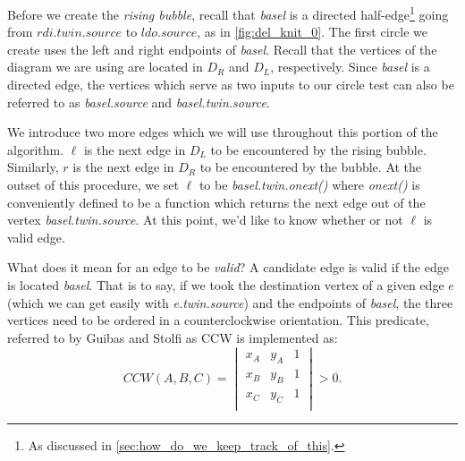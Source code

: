 \documentclass[12pt,twoside]{reedthesis}
\begin{document}


    Before we create the \emph{rising bubble}, recall that \emph{basel} is a directed half-edge\footnote{As discussed in \cref{sec:how_do_we_keep_track_of_this}.} going from $rdi.twin.source$ to $ldo.source$, as in \cref{fig:del_knit_0}. The first circle we create uses the left and right endpoints of \emph{basel}. Recall that the vertices of the diagram we are using are located in $D_{R}$ and $D_{L}$, respectively. Since \emph{basel} is a directed edge, the vertices which serve as two inputs to our circle test can also be referred to as \emph{basel.source} and \emph{basel.twin.source}.\par

    We introduce two more edges which we will use throughout this portion of the algorithm. $\ell$ is the next edge in $D_{L}$ to be encountered by the rising bubble. Similarly, $r$ is the next edge in $D_{R}$ to be encountered by the bubble. At the outset of this procedure, we set $\ell$ to be \emph{basel.twin.onext()} where \emph{onext()} is conveniently defined to be a function which returns the next edge out of the vertex \emph{basel.twin.source}. At this point, we'd like to know whether or not $\ell$ is valid edge. \par 

    What does it mean for an edge to be \emph{valid}? A candidate edge is valid if the edge is located  \emph{basel}. That is to say, if we took the destination vertex of a given edge $e$ (which we can get easily with \emph{e.twin.source}) and the endpoints of \emph{basel}, the three vertices need to be ordered in a counterclockwise orientation. This predicate, referred to by Guibas and Stolfi as \textsc{CCW} is implemented as:
    $$
    CCW(A,B,C) =
    \begin{vmatrix}
    x_{A} & y_{A} & 1 \\
    x_{B} & y_{B} & 1 \\
    x_{C} & y_{C} & 1 \\  
    \end{vmatrix} > 0.
    $$  
\end{document}
